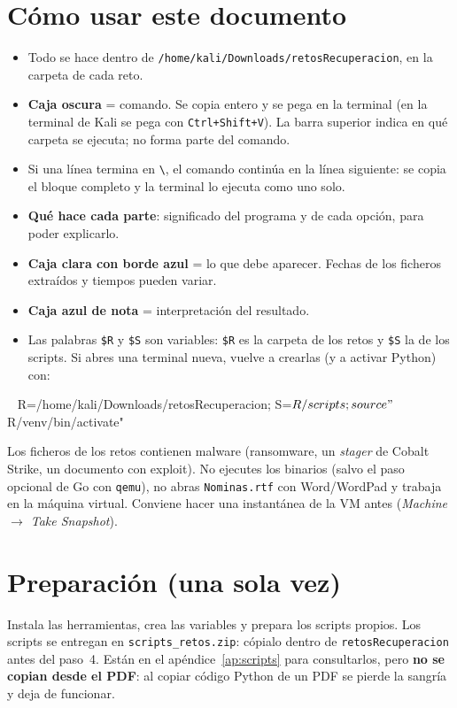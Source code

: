 \documentclass[11pt,a4paper]{article}
\begin{document}
\clearpage
\tableofcontents
\clearpage


\section{Cómo usar este documento}
\begin{itemize}
  \item Todo se hace dentro de \texttt{/home/kali/Downloads/retosRecuperacion}, en la carpeta de cada reto.
  \item \textbf{Caja oscura} = comando. Se copia entero y se pega en la terminal (en la terminal de Kali se pega con
        \texttt{Ctrl+Shift+V}). La barra superior indica en qué carpeta se ejecuta; no forma parte del comando.
  \item Si una línea termina en \texttt{\textbackslash}, el comando continúa en la línea siguiente: se copia el bloque
        completo y la terminal lo ejecuta como uno solo.
  \item \textbf{Qué hace cada parte}: significado del programa y de cada opción, para poder explicarlo.
  \item \textbf{Caja clara con borde azul} = lo que debe aparecer. Fechas de los ficheros extraídos y tiempos pueden variar.
  \item \textbf{Caja azul de nota} = interpretación del resultado.
  \item Las palabras \texttt{\$R} y \texttt{\$S} son variables: \texttt{\$R} es la carpeta de los retos y \texttt{\$S} la de
        los scripts. Si abres una terminal nueva, vuelve a crearlas (y a activar Python) con:
\end{itemize}
\begin{comando}{~}
R=/home/kali/Downloads/retosRecuperacion; S=$R/scripts; source "$R/venv/bin/activate"
\end{comando}

\begin{aviso}[Seguridad]
Los ficheros de los retos contienen malware (ransomware, un \emph{stager} de Cobalt Strike, un documento con exploit).
No ejecutes los binarios (salvo el paso opcional de Go con \texttt{qemu}), no abras \texttt{Nominas.rtf} con Word/WordPad
y trabaja en la máquina virtual. Conviene hacer una instantánea de la VM antes (\emph{Machine $\to$ Take Snapshot}).
\end{aviso}


\section{Preparación (una sola vez)}
Instala las herramientas, crea las variables y prepara los scripts propios. Los scripts se entregan en
\texttt{scripts\_retos.zip}: cópialo dentro de \texttt{retosRecuperacion} antes del paso~4. Están en el
apéndice~\ref{ap:scripts} para consultarlos, pero \textbf{no se copian desde el PDF}: al copiar código Python de un PDF
se pierde la sangría y deja de funcionar.
\end{document}
